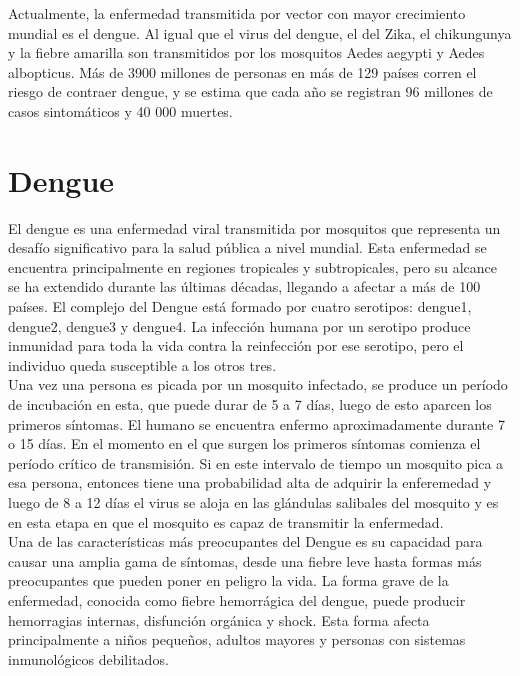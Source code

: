 Actualmente, la enfermedad transmitida por vector con mayor crecimiento mundial es el dengue. 
Al igual que el virus del dengue, el del Zika, el chikungunya y la fiebre amarilla son transmitidos 
por los mosquitos Aedes aegypti y Aedes albopticus. Más de 3900 millones de personas en más de 129 
países corren el riesgo de contraer dengue, y se estima que cada año se registran 96 millones de casos 
sintomáticos y 40 000 muertes.\autocite{OMS2020}\\

\section{Dengue}
El dengue es una enfermedad viral transmitida por mosquitos que representa un desafío significativo 
para la salud pública a nivel mundial. Esta enfermedad se encuentra principalmente en regiones tropicales 
y subtropicales, pero su alcance se ha extendido durante las últimas décadas, llegando a afectar a más de 100 
países. El complejo del Dengue está formado por cuatro serotipos: dengue1, dengue2, dengue3 y dengue4. La 
infección humana por un serotipo produce inmunidad para toda la vida contra la reinfección por ese serotipo, 
pero el individuo queda susceptible a los otros tres. \autocite{Simmons2012} \\

Una vez una persona es picada por un mosquito infectado, se produce un período de incubación en esta, que puede 
durar de 5 a 7 días, luego de esto aparcen los primeros síntomas. El humano se encuentra enfermo aproximadamente
durante 7 o 15 días. En el momento en el que surgen los primeros síntomas comienza el período crítico de 
transmisión. Si en este intervalo de tiempo un mosquito pica a esa persona, entonces tiene una probabilidad 
alta de adquirir la enferemedad y luego de 8 a 12 días el virus se aloja en las glándulas salibales del mosquito
y es en esta etapa en que el mosquito es capaz de transmitir la enfermedad. \autocite{OMS2023} \\

Una de las características más preocupantes del Dengue es su capacidad para causar una amplia gama de síntomas, 
desde una fiebre leve hasta formas más preocupantes que pueden poner en peligro la vida. La forma grave de la 
enfermedad, conocida como fiebre hemorrágica del dengue, puede producir hemorragias internas, 
disfunción orgánica y shock. Esta forma afecta principalmente a niños pequeños, 
adultos mayores y personas con sistemas inmunológicos debilitados.\\

